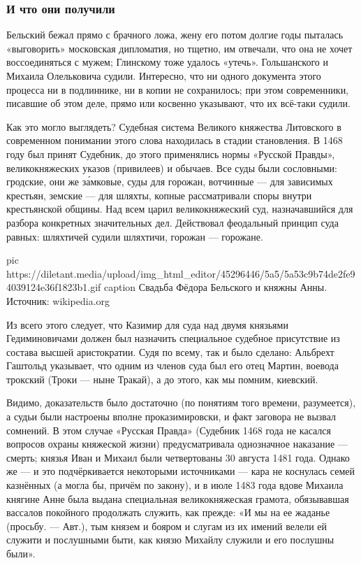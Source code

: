 \subsubsection{И что они получили}

Бельский бежал прямо с брачного ложа, жену его потом долгие годы пыталась
«выговорить» московская дипломатия, но тщетно, им отвечали, что она не хочет
воссоединяться с мужем; Глинскому тоже удалось «утечь». Гольшанского и Михаила
Олельковича судили. Интересно, что ни одного документа этого процесса ни в
подлиннике, ни в копии не сохранилось; при этом современники, писавшие об этом
деле, прямо или косвенно указывают, что их всё-таки судили.

Как это могло выглядеть? Судебная система Великого княжества Литовского в
современном понимании этого слова находилась в стадии становления. В 1468 году
был принят Судебник, до этого применялись нормы «Русской Правды»,
великокняжеских указов (привилеев) и обычаев. Все суды были сословными:
гродские, они же за́мковые, суды для горожан, вотчинные — для зависимых
крестьян, земские — для шляхты, копные рассматривали споры внутри крестьянской
общины. Над всем царил великокняжеский суд, назначавшийся для разбора
конкретных значительных дел. Действовал феодальный принцип суда равных:
шляхтичей судили шляхтичи, горожан — горожане. 

\ifcmt
  pic https://diletant.media/upload/img_html_editor/45296446/5a5/5a53c9b74de2fe94039124e36f1823b1.gif
  caption Свадьба Фёдора Бельского и княжны Анны. Источник: wikipedia.org
\fi

Из всего этого следует, что Казимир для суда над двумя князьями Гедиминовичами
должен был назначить специальное судебное присутствие из состава высшей
аристократии. Судя по всему, так и было сделано: Альбрехт Гаштольд указывает,
что одним из членов суда был его отец Мартин, воевода трокский (Троки — ныне
Тракай), а до этого, как мы помним, киевский.

Видимо, доказательств было достаточно (по понятиям того времени, разумеется), а
судьи были настроены вполне проказимировски, и факт заговора не вызвал
сомнений. В этом случае «Русская Правда» (Судебник 1468 года не касался
вопросов охраны княжеской жизни) предусматривала однозначное наказание —
смерть; князья Иван и Михаил были четвертованы 30 августа 1481 года. Однако же
— и это подчёркивается некоторыми источниками — кара не коснулась семей
казнённых (а могла бы, причём по закону), и в июле 1483 года вдове Михаила
княгине Анне была выдана специальная великокняжеская грамота, обязывавшая
вассалов покойного продолжать служить, как прежде: «И мы на ее жаданье
(просьбу. — Авт.), тым князем и бояром и слугам из их имений велели ей служити
и послушными быти, как князю Михайлу служили и его послушны были».

